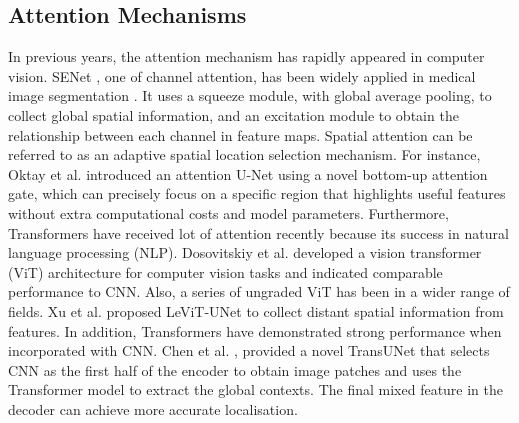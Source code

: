\documentclass[a4paper,fleqn]{cas-dc}
\begin{document}
\subsection{Attention Mechanisms}
In previous years, the attention mechanism has rapidly appeared in computer vision. SENet \cite{hu2018squeeze}, one of channel attention, has been widely applied in medical image segmentation \cite{kaul2019focusnet,liu2022co}. It uses a squeeze module, with global average pooling, to collect global spatial information, and an excitation module to obtain the relationship between each channel in feature maps. Spatial attention can be referred to as an adaptive spatial location selection mechanism. For instance, Oktay et al. \cite{oktay2018attention} introduced an attention U-Net using a novel bottom-up attention gate, which can precisely focus on a specific region that highlights useful features without extra computational costs and model parameters. Furthermore, Transformers \cite{vaswani2017attention} have received lot of attention recently because its success in natural language processing (NLP). Dosovitskiy et al. \cite{yuan2019segmentation} developed a vision transformer (ViT) architecture for computer vision tasks and indicated comparable performance to CNN. Also, a series of ungraded ViT has been in a wider range of fields. Xu et al. \cite{xu2021levit} proposed LeViT-UNet to collect distant spatial information from features. In addition, Transformers have demonstrated strong performance when incorporated with CNN. Chen et al. \cite{chen2021transunet}, provided a novel TransUNet that selects CNN as the first half of the encoder to obtain image patches and uses the Transformer model to extract the global contexts. The final mixed feature in the decoder can achieve more accurate localisation.
\end{document}
